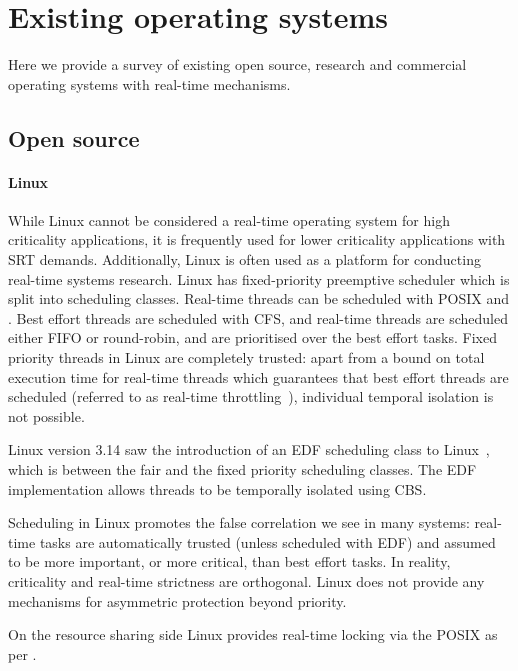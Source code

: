 \section{Existing operating systems}

Here we provide a survey of existing open source, research and commercial operating systems with
real-time mechanisms. 

\subsection{Open source}

\paragraph{Linux} While Linux cannot be considered a real-time operating system for high criticality applications, it
is frequently used for lower criticality applications with \gls{SRT} demands.  Additionally, Linux
is often used as a platform for conducting real-time systems research. 
Linux has fixed-priority preemptive scheduler which is split into scheduling classes.  Real-time
threads can be scheduled with \gls{POSIX} \schedfifo and \schedsporadic. Best effort threads are
scheduled with \gls{CFS}, and real-time threads are scheduled either \gls{FIFO} or round-robin, and
are prioritised over the best effort tasks.  Fixed priority threads in Linux are completely trusted:
apart from a bound on total execution time for real-time threads which guarantees that best effort
threads are scheduled (referred to as real-time throttling~\citep{Corbet_08}), individual temporal
isolation is not possible.

Linux version 3.14 saw the introduction of an \gls{EDF} scheduling class to Linux~\citep{Corbet_09},
which is between the fair and the fixed priority scheduling classes.  The \gls{EDF} implementation
allows threads to be temporally isolated using \gls{CBS}.

Scheduling in Linux promotes the false correlation we see in many systems: real-time tasks are
automatically trusted (unless scheduled with \gls{EDF}) and assumed to be more important, or more
critical, than best effort tasks.  In reality, criticality and real-time strictness are orthogonal.
Linux does not provide any mechanisms for asymmetric protection beyond priority.

On the resource sharing side Linux provides real-time locking via the POSIX  as per
.

